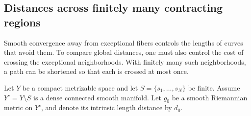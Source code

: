 \subsection{Distances across finitely many contracting regions}
\label{subsec:finite-collapse-distance}

Smooth convergence away from exceptional fibers controls the lengths of curves that avoid them. To compare global distances, one must also control the cost of crossing the exceptional neighborhoods. With finitely many such neighborhoods, a path can be shortened so that each is crossed at most once.

Let $Y$ be a compact metrizable space and let $S=\{s_1,\ldots,s_N\}$ be finite. Assume $Y^\circ=Y\setminus S$ is a dense connected smooth manifold. Let $g_0$ be a smooth Riemannian metric on $Y^\circ$, and denote its intrinsic length distance by $d_0$.

